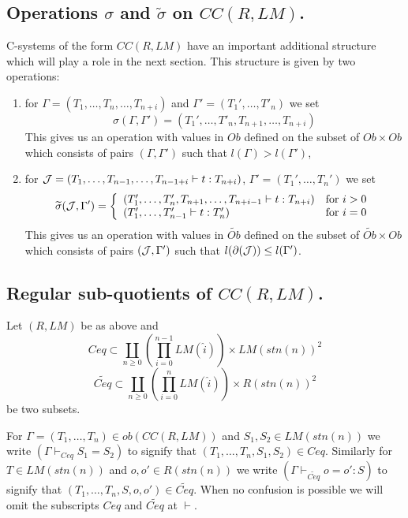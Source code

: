 \documentclass[11pt]{article}
\newcommand{\wt}{\widetilde}
\newcommand{\wh}{\widehat}
\begin{document}
\subsection{Operations $\sigma$ and $\wt{\sigma}$ on $CC(R,LM)$.}
%
C-systems of the form $CC(R,LM)$ have an important additional structure which will play a role in the next section. This structure is given by two operations:
%
\begin{enumerate}
\item for $\Gamma=(T_1,\dots,T_n,\dots,T_{n+i})$ and $\Gamma'=(T_1',\dots,T'_{n})$ we set
%
$$\sigma(\Gamma,\Gamma')=(T_1',\dots,T'_n,T_{n+1},\dots,T_{n+i})$$
%
This gives us an operation with values in $Ob$ defined on the subset of $Ob\times Ob$ which consists of pairs $(\Gamma,\Gamma')$ such that $l(\Gamma)>l(\Gamma')$,
\item for ${\cal J}=(T_1,\dots,T_{n-1},\dots,T_{n-1+i}\vdash t:T_{n+i})$, $\Gamma'=(T_1',\dots,T_n')$ we set
%
$$\wt{\sigma}({\cal J},\Gamma')=
\left\{ 
\begin{array}{ll}
(T_1',\dots,T_n',T_{n+1},\dots,T_{n+i-1}\vdash t:T_{n+i})&\mbox{\rm for $i>0$}\\
(T_1',\dots,T_{n-1}'\vdash t:T_n')&\mbox{\rm for $i=0$}
\end{array}
\right.
$$
%
This gives us an operation with values in $\wt{Ob}$ defined on the subset of $\wt{Ob}\times Ob$ which consists of pairs $({\cal J},\Gamma')$ such that $l(\partial({\cal J}))\le l(\Gamma')$.
\end{enumerate}
%




\subsection{Regular sub-quotients of $CC(R,LM)$.} 
%

Let $(R,LM)$ be as above and
%
$$Ceq\subset \coprod_{n\ge 0}  (\prod_{i=0}^{n-1} LM(\wh{i}))\times LM({stn(n)})^2$$
$$\wt{Ceq}\subset \coprod_{n\ge 0}  (\prod_{i=0}^{n} LM(\wh{i}))\times R({stn(n)})^2$$
%
be two subsets.  

For $\Gamma=(T_1,\dots,T_n)\in ob(CC(R,LM))$ and $S_1,S_2\in LM({stn(n)})$ we write $(\Gamma\vdash_{Ceq} S_1=S_2)$ to signify that $(T_1,\dots,T_n,S_1,S_2)\in Ceq$. Similarly for $T\in LM({stn(n)})$ and $o,o'\in R({stn(n)})$ we write $(\Gamma\vdash_{\wt{Ceq}} o=o':S)$ to signify that $(T_1,\dots,T_n,S,o,o')\in \wt{Ceq}$.  When no confusion is possible we will omit the subscripts $Ceq$ and $\wt{Ceq}$ at $\vdash$. 
\end{document}
